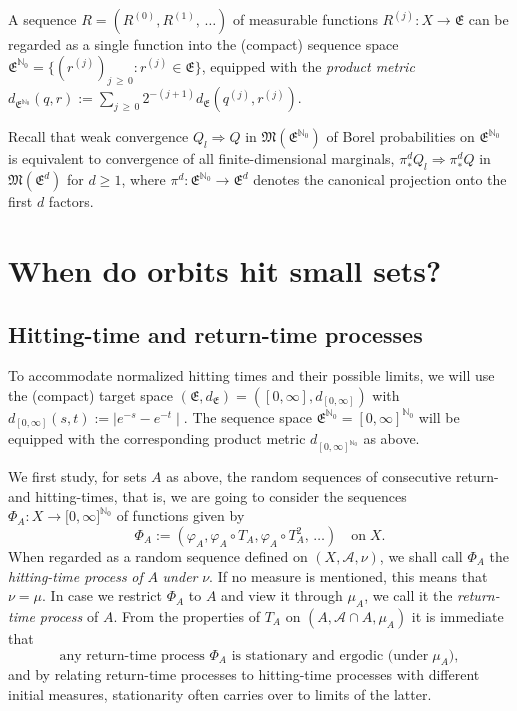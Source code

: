 \documentclass[10pt]{amsart}
\theoremstyle{definition}\newtheorem{defi}[theo]{Definition}\newtheorem{rema}[theo]{Remark}\newtheorem{exam}[theo]{Example}\newtheorem{exem}[theo]{Example}\newtheorem{nota}[theo]{Notation}
\newcommand{\clA}{\mathcal{A}}
\newcommand{\frkE}{\mathfrak{E}}
\newcommand{\frkM}{\mathfrak{M}}
\newcommand{\bbN}{\mathbb{N}}
\begin{document}
A sequence $R=(R^{(0)},R^{(1)},\,\ldots)$ of measurable functions $R^{(j)} :X\rightarrow\frkE$ can be regarded as a single function into the (compact) sequence space $\frkE^{\bbN_{0}}=\{(r^{(j)})_{j\,\geq\,0}:r^{(j)}\in\frkE\}$, equipped with the \emph{product metric} $d_{\frkE^{\bbN_{0}}}(q,r):=\sum_{j\,\geq\,0}2^{-(j+1)} d_{\frkE}(q^{(j)},r^{(j)})$.

Recall that weak convergence $Q_{l}\Longrightarrow Q$ in $\frkM (\frkE^{\bbN_{0}})$ of Borel probabilities on $\frkE ^{\bbN_{0}}$ is equivalent to convergence of all finite-dimensional marginals, $\pi_{\ast}^{d}Q_{l}\Longrightarrow\pi_{\ast}^{d}Q$ in $\frkM(\frkE^{d})$ for $d\geq1$, where $\pi^{d}:\frkE ^{\bbN_{0}}\rightarrow\frkE^{d}$ denotes the canonical projection onto the first $d$ factors.




\section{When do orbits hit small sets?}\label{Sec_When}


\subsection{Hitting-time and return-time processes}
To accommodate normalized hitting times and their possible limits, we will use the (compact) target space $(\frkE,d_{\frkE})=([0,\infty],d_{[0,\infty]})$ with $d_{[0,\infty]}(s,t):=\mid e^{-s}-e^{-t}\mid$. The sequence space $\frkE^{\bbN_{0}}=[0,\infty]^{\bbN_{0}}$ will be equipped with the corresponding product metric $d_{[0,\infty]^{\bbN_{0}}}$ as above.

We first study, for sets $A$ as above, the random sequences of consecutive return- and hitting-times, that is, we are going to consider the sequences $\Phi_{A}:X\rightarrow\lbrack0,\infty]^{\bbN_{0}}$ of functions given by
\begin{equation}\label{Eq_DefHitProc}
\Phi_{A}:=\left(\varphi_{A},\varphi_{A}\circ T_{A},\varphi_{A}\circ T_{A} ^{2},\,\ldots\right)\quad\text{on}\; X.
\end{equation}
When regarded as a random sequence defined on $(X,\clA,\nu)$, we shall call $\Phi_{A}$ the \emph{hitting-time process} \emph{of} $A$ \emph{under} $\nu$. If no measure is mentioned, this means that $\nu=\mu$. In case we restrict $\Phi_{A}$ to $A$ and view it through $\mu_{A}$, we call it the
\emph{return-time process} of $A$. From the properties of $T_{A}$ on $(A,\clA\cap A,\mu_{A})$ it is immediate that
\begin{equation} \label{Eq_bvxcnb}
\text{any return-time process }\Phi_{A}\text{ is stationary and ergodic (under}\; \mu_{A}),
\end{equation}
and by relating return-time processes to hitting-time processes with different initial measures, stationarity often carries over to limits of the latter. 
\end{document}
